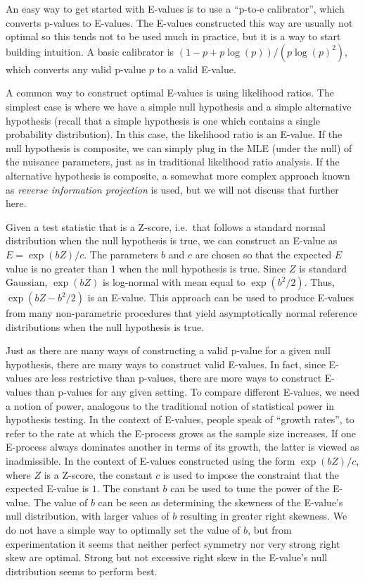 An easy way to get started with E-values is to use a ``p-to-e calibrator'', which converts p-values to E-values. The E-values constructed this way are usually not optimal so this tends not to be used much in practice, but it is a way to start building intuition. A basic calibrator is $(1 - p + p\log(p)) / (p \log(p)^2)$, which converts any valid p-value $p$ to a valid E-value.

A common way to construct optimal E-values is using likelihood ratios. The simplest case is where we have a simple null hypothesis and a simple alternative hypothesis (recall that a simple hypothesis is one which contains a single probability distribution). In this case, the likelihood ratio is an E-value. If the null hypothesis is composite, we can simply plug in the MLE (under the null) of the nuisance parameters, just as in traditional likelihood ratio analysis. If the alternative hypothesis is composite, a somewhat more complex approach known as \textit{reverse information projection} is used, but we will not discuss that further here.

Given a test statistic that is a Z-score, i.e.\ that follows a standard normal distribution when the null hypothesis is true, we can construct an E-value as $E = \exp(bZ)/c$. The parameters $b$ and $c$ are chosen so that the expected $E$ value is no greater than 1 when the null hypothesis is true. Since $Z$ is standard Gaussian, $\exp(bZ)$ is log-normal with mean equal to $\exp(b^2/2)$. Thus, $\exp(bZ - b^2/2)$ is an E-value. This approach can be used to produce E-values from many non-parametric procedures that yield asymptotically normal reference distributions when the null hypothesis is true.

Just as there are many ways of constructing a valid p-value for a given null hypothesis, there are many ways to construct valid E-values. In fact, since E-values are less restrictive than p-values, there are more ways to construct E-values than p-values for any given setting. To compare different E-values, we need a notion of power, analogous to the traditional notion of statistical power in hypothesis testing. In the context of E-values, people speak of ``growth rates'', to refer to the rate at which the E-process grows as the sample size increases. If one E-process always dominates another in terms of its growth, the latter is viewed as inadmissible. In the context of E-values constructed using the form $\exp(bZ)/c$, where $Z$ is a Z-score, the constant $c$ is used to impose the constraint that the expected E-value is $1$. The constant $b$ can be used to tune the power of the E-value. The value of $b$ can be seen as determining the skewness of the E-value's null distribution, with larger values of $b$ resulting in greater right skewness. We do not have a simple way to optimally set the value of $b$, but from experimentation it seems that neither perfect symmetry nor very strong right skew are optimal. Strong but not excessive right skew in the E-value's null distribution seems to perform best.

